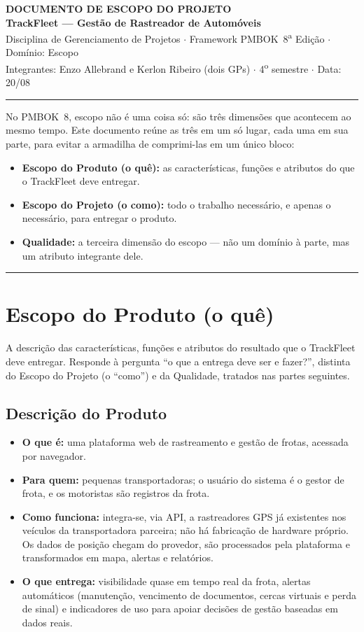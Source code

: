 \documentclass[11pt,a4paper]{article}
\newcommand{\cabecalho}[3]{%
  \begin{center}
  {\Large\bfseries DOCUMENTO DE #1 DO PROJETO}\\[2pt]
  {\large\bfseries TrackFleet --- Gestão de Rastreador de Automóveis}\\[4pt]
  Disciplina de Gerenciamento de Projetos $\cdot$ Framework PMBOK\textregistered\ 8\textsuperscript{a} Edição $\cdot$ Domínio: #2\\[2pt]
  Integrantes: Enzo Allebrand e Kerlon Ribeiro (dois GPs) $\cdot$ 4\textsuperscript{o} semestre $\cdot$ Data: #3
  \end{center}
  \vspace{2mm}\hrule\vspace{4mm}}
\newcommand{\separador}{\par\vspace{2mm}\hrule\vspace{4mm}}
\begin{document}
\cabecalho{ESCOPO}{Escopo}{20/08}

\noindent No PMBOK\textregistered\ 8, escopo não é uma coisa só: são três dimensões que acontecem ao mesmo tempo. Este documento reúne as três em um só lugar, cada uma em sua parte, para evitar a armadilha de comprimi-las em um único bloco:
\begin{itemize}[itemsep=2pt]
  \item \textbf{Escopo do Produto (o quê):} as características, funções e atributos do que o TrackFleet deve entregar.
  \item \textbf{Escopo do Projeto (o como):} todo o trabalho necessário, e apenas o necessário, para entregar o produto.
  \item \textbf{Qualidade:} a terceira dimensão do escopo --- não um domínio à parte, mas um atributo integrante dele.
\end{itemize}

\separador

\section{Escopo do Produto (o quê)}\label{esc:produto}

\noindent A descrição das características, funções e atributos do resultado que o TrackFleet deve entregar. Responde à pergunta ``o que a entrega deve ser e fazer?'', distinta do Escopo do Projeto (o ``como'') e da Qualidade, tratados nas partes seguintes.

\subsection{Descrição do Produto}
\begin{itemize}[itemsep=3pt]
  \item \textbf{O que é:} uma plataforma web de rastreamento e gestão de frotas, acessada por navegador.
  \item \textbf{Para quem:} pequenas transportadoras; o usuário do sistema é o gestor de frota, e os motoristas são registros da frota.
  \item \textbf{Como funciona:} integra-se, via API, a rastreadores GPS já existentes nos veículos da transportadora parceira; não há fabricação de hardware próprio. Os dados de posição chegam do provedor, são processados pela plataforma e transformados em mapa, alertas e relatórios.
  \item \textbf{O que entrega:} visibilidade quase em tempo real da frota, alertas automáticos (manutenção, vencimento de documentos, cercas virtuais e perda de sinal) e indicadores de uso para apoiar decisões de gestão baseadas em dados reais.
\end{itemize}
\end{document}
